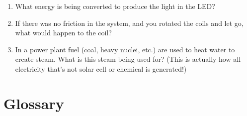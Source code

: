 \documentclass[12pt]{book}
\begin{document}
\begin{enumerate}
 \item What energy is being converted to produce the light in the LED?

\item If there was no friction in the system, and you rotated the coils and let go, what would happen to the coil?

\item In a power plant fuel (coal, heavy nuclei, etc.) are used to heat water to create steam. What is this steam being used for? (This is actually how all electricity that's not solar cell or chemical is generated!)
\end{enumerate}


\pagebreak

\appendix

\chapter{Glossary}
\end{document}
